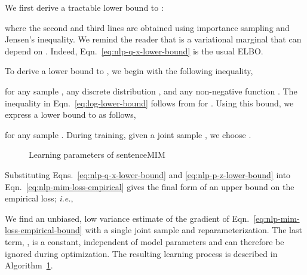 \documentclass{article}
\newcommand{\ie}{{\em i.e.}}
\begin{document}
We first derive a tractable lower bound to :

where the second and third lines are obtained using importance sampling and Jensen's inequality.
We remind the reader that  is a variational marginal that can depend
on .  Indeed, Eqn.\ \eqref{eq:nlp-q-x-lower-bound} is the usual ELBO.

To derive a lower bound to , we begin with the following inequality,

for any sample , any discrete distribution , and any non-negative function .
The inequality in Eqn.\ \eqref{eq:log-lower-bound} follows from  for .
Using this bound, we express a lower bound to  as follows,

for any sample . During training, given a joint sample , we choose .

\begin{figure}[t]
\vspace*{-0.35cm}
\centering
\begin{minipage}[t]{0.95\columnwidth}
\begin{algorithm}[H]
    \caption{Learning parameters  of sentenceMIM}
    \label{algo:sentencemim}
    \begin{algorithmic}[1]
        \STATE 
        \STATE 
        \STATE 
        \ENDWHILE
    \end{algorithmic}
\end{algorithm}
\end{minipage}
\vspace*{-0.5cm}
\end{figure}


Substituting Eqns.\ \eqref{eq:nlp-q-x-lower-bound} and \eqref{eq:nlp-p-z-lower-bound}
into Eqn.\ \eqref{eq:nlp-mim-loss-empirical} gives the final form of an
upper bound on the empirical loss; \ie,

We find an unbiased, low variance estimate of the gradient of Eqn.\ \eqref{eq:nlp-mim-loss-empirical-bound}
with a single joint sample  and reparameterization.
The last term, , is a constant, independent of model parameters
and can therefore be ignored during optimization.
The resulting learning process is described in Algorithm\ \ref{algo:sentencemim}.
\end{document}
